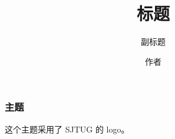 \documentclass{ctexbeamer}
\begin{document}
    \title{标题}
    \subtitle{副标题}
    \author{作者}
    \maketitle
    \begin{frame}
        \frametitle{\sjtugtext 主题}
        这个主题采用了 SJTUG 的 logo。
    \end{frame}
    \makebottom
\end{document}
